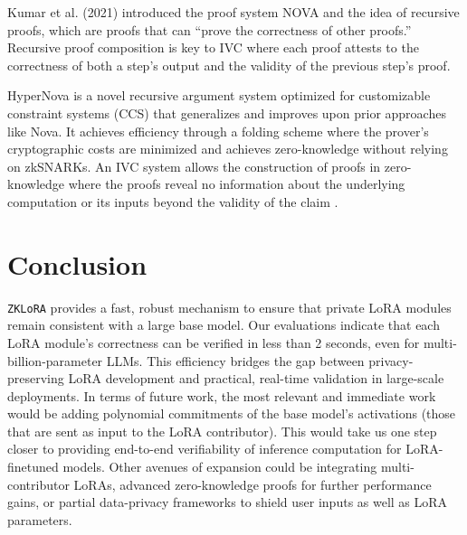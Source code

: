 \documentclass[11pt]{article}
\begin{document}
Kumar et al. (2021) \cite{kothapalli2022nova} introduced the proof system NOVA and the idea of recursive proofs, which are proofs that can ``prove the correctness of other proofs.'' Recursive proof composition is key to IVC where each proof attests to the correctness of both a step’s output and the validity of the previous step’s proof.

HyperNova \cite{kothapalli2024hypernova} is a novel recursive argument system optimized for customizable constraint systems (CCS) that generalizes and improves upon prior approaches like Nova. It achieves efficiency through a folding scheme where the prover’s cryptographic costs are minimized and achieves zero-knowledge without relying on zkSNARKs. An IVC system allows the construction of proofs in zero-knowledge where the proofs reveal no information about the underlying computation or its inputs beyond the validity of the claim \cite{valiant2008incrementally}.

\section{Conclusion}

\texttt{ZKLoRA} provides a fast, robust mechanism to ensure that private LoRA modules remain consistent with a large base model. Our evaluations indicate that each LoRA module’s correctness can be verified in less than 2 seconds, even for multi-billion-parameter LLMs. This efficiency bridges the gap between privacy-preserving LoRA development and practical, real-time validation in large-scale deployments. In terms of future work, the most relevant and immediate work would be adding polynomial commitments of the base model's activations (those that are sent as input to the LoRA contributor). This would take us one step closer to providing end-to-end verifiability of inference computation for LoRA-finetuned models.  Other avenues of expansion could be integrating multi-contributor LoRAs, advanced zero-knowledge proofs for further performance gains, or partial data-privacy frameworks to shield user inputs as well as LoRA parameters. 



\end{document}
